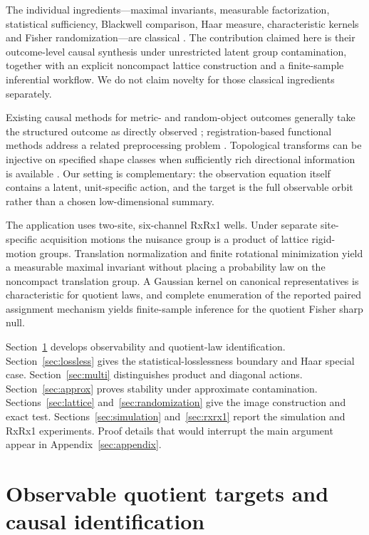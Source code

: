\documentclass[11pt]{article}
\theoremstyle{plain}
\theoremstyle{definition}
\numberwithin{equation}{section}
\newcommand{\1}{\mathbf 1}
\begin{document}
The individual ingredients---maximal invariants, measurable factorization, statistical sufficiency, Blackwell comparison, Haar measure, characteristic kernels and Fisher randomization---are classical \citep{Blackwell1953,Eaton1989,Wijsman1990,Fisher1935}. The contribution claimed here is their outcome-level causal synthesis under unrestricted latent group contamination, together with an explicit noncompact lattice construction and a finite-sample inferential workflow. We do not claim novelty for those classical ingredients separately.

Existing causal methods for metric- and random-object outcomes generally take the structured outcome as directly observed \citep{Kurisu2024,Shin2024,Bhattacharjee2025}; registration-based functional methods address a related preprocessing problem \citep{Raykov2025}. Topological transforms can be injective on specified shape classes when sufficiently rich directional information is available \citep{Turner2014,Curry2022}. Our setting is complementary: the observation equation itself contains a latent, unit-specific action, and the target is the full observable orbit rather than a chosen low-dimensional summary.

The application uses two-site, six-channel RxRx1 wells. Under separate site-specific acquisition motions the nuisance group is a product of lattice rigid-motion groups. Translation normalization and finite rotational minimization yield a measurable maximal invariant without placing a probability law on the noncompact translation group. A Gaussian kernel on canonical representatives is characteristic for quotient laws, and complete enumeration of the reported paired assignment mechanism yields finite-sample inference for the quotient Fisher sharp null.

Section~\ref{sec:observable} develops observability and quotient-law identification. Section~\ref{sec:lossless} gives the statistical-losslessness boundary and Haar special case. Section~\ref{sec:multi} distinguishes product and diagonal actions. Section~\ref{sec:approx} proves stability under approximate contamination. Sections~\ref{sec:lattice} and~\ref{sec:randomization} give the image construction and exact test. Sections~\ref{sec:simulation} and~\ref{sec:rxrx1} report the simulation and RxRx1 experiments. Proof details that would interrupt the main argument appear in Appendix~\ref{sec:appendix}.

\section{Observable quotient targets and causal identification}\label{sec:observable}
\end{document}
